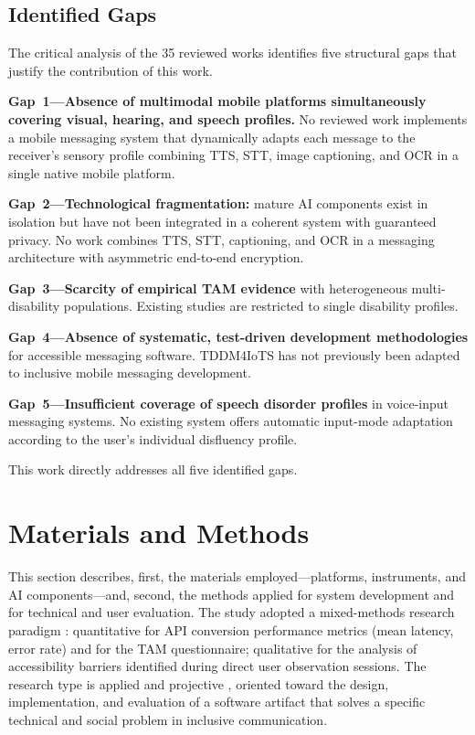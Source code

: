 \documentclass[journal]{IEEEtran}
\begin{document}
	\subsection{Identified Gaps}
	The critical analysis of the 35 reviewed works identifies five
	structural gaps that justify the contribution of this work.
	
	\textbf{Gap~1---Absence of multimodal mobile platforms simultaneously
		covering visual, hearing, and speech profiles.}
	No reviewed work implements a mobile messaging system that
	dynamically adapts each message to the receiver's sensory
	profile combining TTS, STT, image captioning, and OCR in a
	single native mobile platform.
	
	\textbf{Gap~2---Technological fragmentation:} mature AI components
	exist in isolation but have not been integrated in a coherent
	system with guaranteed privacy.
	No work combines TTS, STT, captioning, and OCR in a messaging
	architecture with asymmetric end-to-end encryption.
	
	\textbf{Gap~3---Scarcity of empirical TAM evidence} with
	heterogeneous multi-disability populations.
	Existing studies are restricted to single disability profiles.
	
	\textbf{Gap~4---Absence of systematic, test-driven development
		methodologies} for accessible messaging software.
	TDDM4IoTS has not previously been adapted to inclusive mobile
	messaging development.
	
	\textbf{Gap~5---Insufficient coverage of speech disorder profiles}
	in voice-input messaging systems.
	No existing system offers automatic input-mode adaptation
	according to the user's individual disfluency profile.
	
	This work directly addresses all five identified gaps.
	
	\section{Materials and Methods}
	\label{sec:methodology}
	This section describes, first, the materials employed---platforms,
	instruments, and AI components---and, second, the methods applied
	for system development and for technical and user evaluation.
	The study adopted a mixed-methods research paradigm \cite{hernandez2014}:
	quantitative for API conversion performance metrics (mean latency,
	error rate) and for the TAM questionnaire; qualitative for the
	analysis of accessibility barriers identified during direct user
	observation sessions.
	The research type is applied and projective \cite{hernandez2014},
	oriented toward the design, implementation, and evaluation of a
	software artifact that solves a specific technical and social
	problem in inclusive communication.
	
\end{document}
